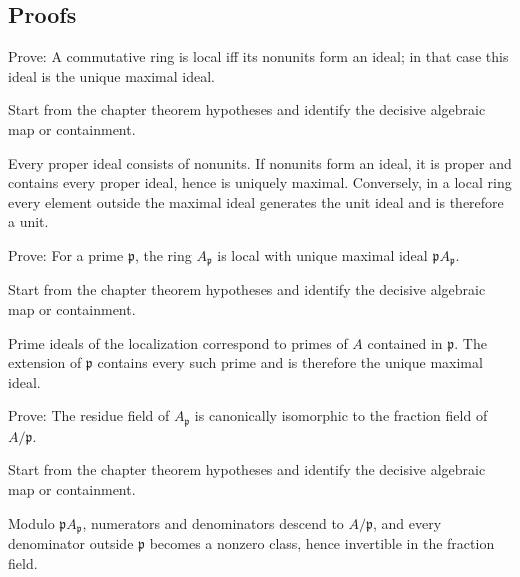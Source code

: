 \subsection*{Proofs}

\begin{exercise}\label{exr:v08-expand-06}
Prove: A commutative ring is local iff its nonunits form an ideal; in that case this ideal is the unique maximal ideal.
\end{exercise}
\begin{hint}
Start from the chapter theorem hypotheses and identify the decisive algebraic map or containment.
\end{hint}
\begin{solution}
Every proper ideal consists of nonunits. If nonunits form an ideal, it is proper and contains every proper ideal, hence is uniquely maximal. Conversely, in a local ring every element outside the maximal ideal generates the unit ideal and is therefore a unit.
\end{solution}

\begin{exercise}\label{exr:v08-expand-07}
Prove: For a prime $\mathfrak p$, the ring $A_{\mathfrak p}$ is local with unique maximal ideal $\mathfrak p A_{\mathfrak p}$.
\end{exercise}
\begin{hint}
Start from the chapter theorem hypotheses and identify the decisive algebraic map or containment.
\end{hint}
\begin{solution}
Prime ideals of the localization correspond to primes of $A$ contained in $\mathfrak p$. The extension of $\mathfrak p$ contains every such prime and is therefore the unique maximal ideal.
\end{solution}

\begin{exercise}\label{exr:v08-expand-08}
Prove: The residue field of $A_{\mathfrak p}$ is canonically isomorphic to the fraction field of $A/\mathfrak p$.
\end{exercise}
\begin{hint}
Start from the chapter theorem hypotheses and identify the decisive algebraic map or containment.
\end{hint}
\begin{solution}
Modulo $\mathfrak p A_{\mathfrak p}$, numerators and denominators descend to $A/\mathfrak p$, and every denominator outside $\mathfrak p$ becomes a nonzero class, hence invertible in the fraction field.
\end{solution}

